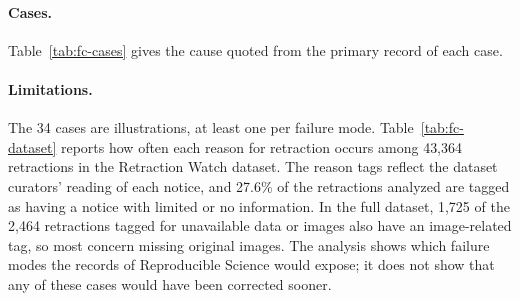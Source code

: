 \paragraph{Cases.} Table~\ref{tab:fc-cases} gives the cause quoted from the primary record of
each case.



\paragraph{Limitations.} The 34 cases are illustrations, at least one per failure mode.
Table~\ref{tab:fc-dataset} reports how often each reason for retraction occurs among 43,364
retractions in the Retraction Watch dataset. The reason tags reflect the dataset curators' reading of each notice, and
27.6\% of the retractions analyzed are tagged as having a notice with limited or no information.
In the full dataset, 1,725 of the 2,464 retractions tagged for unavailable data or images also
have an image-related tag, so most concern missing original images. The analysis shows which
failure modes the records of Reproducible Science would expose; it does not show that any of these
cases would have been corrected sooner.

